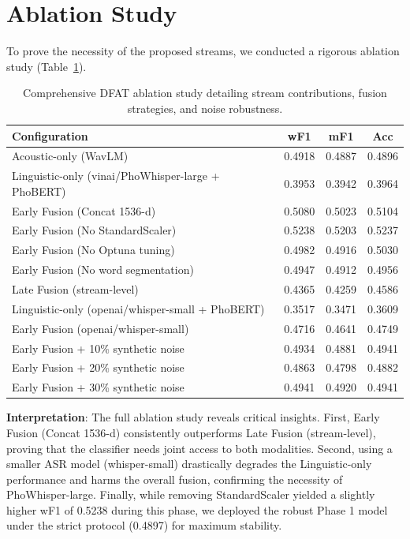 \documentclass[12pt,a4paper]{report}
\begin{document}
\section{Ablation Study}
To prove the necessity of the proposed streams, we conducted a rigorous ablation study (Table~\ref{tab:ablation}).

\begin{table}[h]
\centering
\begin{tabular}{lccc}
\toprule
\textbf{Configuration} & \textbf{wF1} & \textbf{mF1} & \textbf{Acc} \\
\midrule
Acoustic-only (WavLM) & 0.4918 & 0.4887 & 0.4896 \\
Linguistic-only (vinai/PhoWhisper-large + PhoBERT) & 0.3953 & 0.3942 & 0.3964 \\
Early Fusion (Concat 1536-d) & 0.5080 & 0.5023 & 0.5104 \\
Early Fusion (No StandardScaler) & 0.5238 & 0.5203 & 0.5237 \\
Early Fusion (No Optuna tuning) & 0.4982 & 0.4916 & 0.5030 \\
Early Fusion (No word segmentation) & 0.4947 & 0.4912 & 0.4956 \\
Late Fusion (stream-level) & 0.4365 & 0.4259 & 0.4586 \\
Linguistic-only (openai/whisper-small + PhoBERT) & 0.3517 & 0.3471 & 0.3609 \\
Early Fusion (openai/whisper-small) & 0.4716 & 0.4641 & 0.4749 \\
Early Fusion + 10\% synthetic noise & 0.4934 & 0.4881 & 0.4941 \\
Early Fusion + 20\% synthetic noise & 0.4863 & 0.4798 & 0.4882 \\
Early Fusion + 30\% synthetic noise & 0.4941 & 0.4920 & 0.4941 \\
\bottomrule
\end{tabular}
\caption{Comprehensive DFAT ablation study detailing stream contributions, fusion strategies, and noise robustness.}
\label{tab:ablation}
\end{table}

\textbf{Interpretation}: The full ablation study reveals critical insights. First, Early Fusion (Concat 1536-d) consistently outperforms Late Fusion (stream-level), proving that the classifier needs joint access to both modalities. Second, using a smaller ASR model (whisper-small) drastically degrades the Linguistic-only performance and harms the overall fusion, confirming the necessity of PhoWhisper-large. Finally, while removing StandardScaler yielded a slightly higher wF1 of 0.5238 during this phase, we deployed the robust Phase 1 model under the strict protocol (0.4897) for maximum stability.
\end{document}
